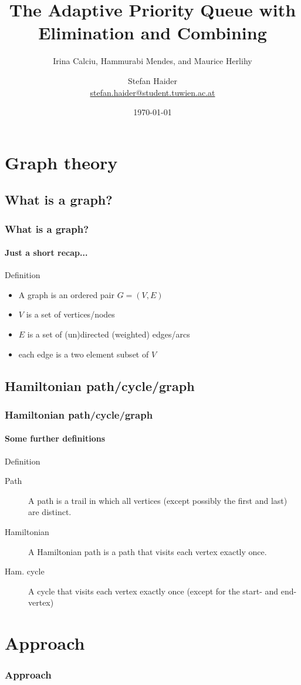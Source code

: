 \documentclass{beamer}
\title{The Adaptive Priority Queue with Elimination and Combining}
\subtitle{Irina Calciu, Hammurabi Mendes, and Maurice Herlihy}
\author{Stefan Haider\\ \scriptsize\href{mailto:stefan.haider@student.tuwien.ac.at}{stefan.haider@student.tuwien.ac.at}}
\institute{184.755 Seminar aus Programmiersprachen}
\date{\today}
\begin{document}
		
	\begin{frame}[plain]
		\titlepage
	\end{frame}
	
	\section{Graph theory}
	\subsection{What is a graph?}
	\begin{frame}
		\frametitle{What is a graph?}
		\framesubtitle{Just a short recap...}
		\begin{block}{Definition}
			\begin{itemize}
				\item A graph is an ordered pair $G=(V,E)$
				\item $V$ is a set of vertices/nodes
				\item $E$ is a set of (un)directed (weighted) edges/arcs
				\item each edge is a two element subset of $V$
			\end{itemize}
		\end{block}
	\end{frame}
	
	\subsection{Hamiltonian path/cycle/graph}
	\begin{frame}
		\frametitle{Hamiltonian path/cycle/graph}
		\framesubtitle{Some further definitions}
		\begin{block}{Definition}
			\begin{description}
				\item[Path] A path is a trail in which all vertices (except possibly the first and last) are distinct.
				\item[Hamiltonian] A Hamiltonian path is a path that visits each vertex exactly once.
				\item[Ham. cycle] A cycle that visits each vertex exactly once (except for the start- and end-vertex)
			\end{description}
		\end{block}		
	\end{frame}
	
	\section{Approach}
	\begin{frame}
		\frametitle{Approach}
		\tableofcontents[
		sections={2},
		subsectionstyle=show/show/hide
		]
	\end{frame}
	
\end{document}
